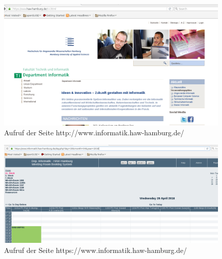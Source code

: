 \documentclass[paper=a4, fontsize=11pt]{scrreprt}
\numberwithin{equation}{section}
\numberwithin{figure}{section}
\numberwithin{table}{section}
\begin{document}
\begin{figure}[!htb] 
  \centering
     \includegraphics[width=1.0\textwidth]{resources/http-aufruf.png}
  \caption{Aufruf der Seite http://www.informatik.haw-hamburg.de/}
  \label{fig:http-site}
\end{figure}

\begin{figure}[!htb] 
  \centering
     \includegraphics[width=1.0\textwidth]{resources/https-aufruf.png}
  \caption{Aufruf der Seite https://www.informatik.haw-hamburg.de/}
  \label{fig:https-site}
\end{figure}
\end{document}
